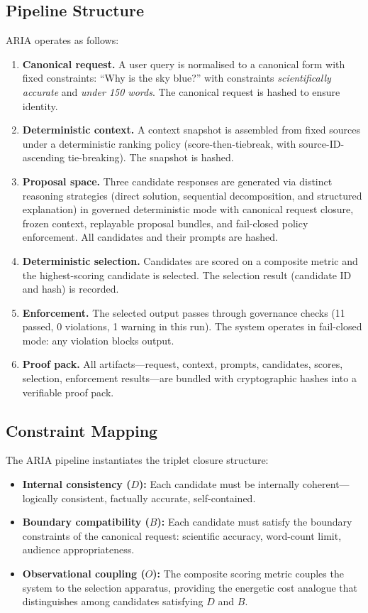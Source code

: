 \documentclass[12pt]{article}
\begin{document}
\subsection{Pipeline Structure}

ARIA operates as follows:
\begin{enumerate}
    \item \textbf{Canonical request.} A user query is normalised to a canonical form with fixed constraints: ``Why is the sky blue?'' with constraints \textit{scientifically accurate} and \textit{under 150 words}. The canonical request is hashed to ensure identity.
    \item \textbf{Deterministic context.} A context snapshot is assembled from fixed sources under a deterministic ranking policy (score-then-tiebreak, with source-ID-ascending tie-breaking). The snapshot is hashed.
    \item \textbf{Proposal space.} Three candidate responses are generated via distinct reasoning strategies (direct solution, sequential decomposition, and structured explanation) in governed deterministic mode with canonical request closure, frozen context, replayable proposal bundles, and fail-closed policy enforcement. All candidates and their prompts are hashed.
    \item \textbf{Deterministic selection.} Candidates are scored on a composite metric and the highest-scoring candidate is selected. The selection result (candidate ID and hash) is recorded.
    \item \textbf{Enforcement.} The selected output passes through governance checks (11 passed, 0 violations, 1 warning in this run). The system operates in fail-closed mode: any violation blocks output.
    \item \textbf{Proof pack.} All artifacts---request, context, prompts, candidates, scores, selection, enforcement results---are bundled with cryptographic hashes into a verifiable proof pack.
\end{enumerate}

\subsection{Constraint Mapping}

The ARIA pipeline instantiates the triplet closure structure:
\begin{itemize}
    \item \textbf{Internal consistency ($D$):} Each candidate must be internally coherent---logically consistent, factually accurate, self-contained.
    \item \textbf{Boundary compatibility ($B$):} Each candidate must satisfy the boundary constraints of the canonical request: scientific accuracy, word-count limit, audience appropriateness.
    \item \textbf{Observational coupling ($O$):} The composite scoring metric couples the system to the selection apparatus, providing the energetic cost analogue that distinguishes among candidates satisfying $D$ and $B$.
\end{itemize}
\end{document}
